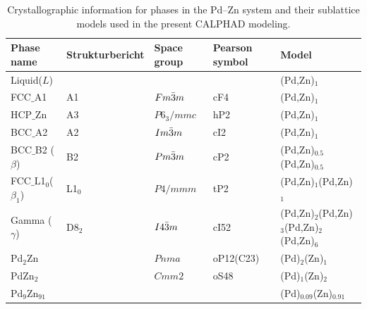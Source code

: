 \begin{table}[H]
    \footnotesize
    \centering
    \caption{Crystallographic information for phases in the Pd–Zn system and their sublattice models used in the present CALPHAD modeling.}
    \begin{tabular}{>{\raggedright\arraybackslash}m{2.5cm}>{\raggedright\arraybackslash}m{2.5cm}>{\raggedright\arraybackslash}m{2cm}>{\raggedright\arraybackslash}m{2.5cm}>{\raggedright\arraybackslash}m{6cm}}
        \hline
         \textbf{Phase name} & \textbf{Strukturbericht} & \textbf{Space group} & \textbf{Pearson symbol} & \textbf{Model} \\
        \hline
         Liquid($L$) &  &  &  & (Pd,Zn)$_1$ \\
         FCC$\_$A1 & A1 & $Fm\Bar{3}m$ & cF4 & (Pd,Zn)$_1$ \\
         HCP$\_$Zn & A3 & $P6_3/mmc$ & hP2 & (Pd,Zn)$_1$ \\
         BCC$\_$A2 & A2 & $Im\Bar{3}m$ & cI2 & (Pd,Zn)$_1$ \\
         BCC$\_$B2 ($\beta$) & B2 & $Pm\Bar{3}m$ & cP2 & (Pd,Zn)$_{0.5}$(Pd,Zn)$_{0.5}$ \\
         FCC$\_$L1$_0$($\beta_1$) & L1$_0$ & $P4/mmm$ & tP2 & (Pd,Zn)$_1$(Pd,Zn)$_1$ \\
         Gamma ($\gamma$) & D8$_2$ & $I4\Bar{3}m$ & cI52 & (Pd,Zn)$_2$(Pd,Zn)$_3$(Pd,Zn)$_2$(Pd,Zn)$_6$ \\
         Pd$_2$Zn &  & $Pnma$ & oP12(C23) & (Pd)$_2$(Zn)$_1$ \\
         PdZn$_2$ &  & $Cmm2$ & oS48 & (Pd)$_1$(Zn)$_2$ \\
         Pd$_9$Zn$_{91}$ &  &  &  & (Pd)$_{0.09}$(Zn)$_{0.91}$ \\
        \hline
    \end{tabular}
    \label{intermetallics:PdZn_phases}
\end{table}

